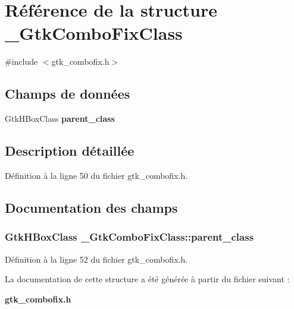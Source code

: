 \section{Référence de la structure \_\-GtkComboFixClass}
\label{struct__GtkComboFixClass}


{\ttfamily \#include $<$gtk\_\-combofix.h$>$}

\subsection*{Champs de données}
\begin{DoxyCompactItemize}
\item 
GtkHBoxClass {\bf parent\_\-class}
\end{DoxyCompactItemize}


\subsection{Description détaillée}


Définition à la ligne 50 du fichier gtk\_\-combofix.h.



\subsection{Documentation des champs}
\subsubsection[{parent\_\-class}]{\setlength{\rightskip}{0pt plus 5cm}GtkHBoxClass {\bf \_\-GtkComboFixClass::parent\_\-class}}\label{struct__GtkComboFixClass_a168f1a0fcf79ed5a283bdf8c5f518f15}


Définition à la ligne 52 du fichier gtk\_\-combofix.h.



La documentation de cette structure a été générée à partir du fichier suivant :\begin{DoxyCompactItemize}
\item 
{\bf gtk\_\-combofix.h}\end{DoxyCompactItemize}
